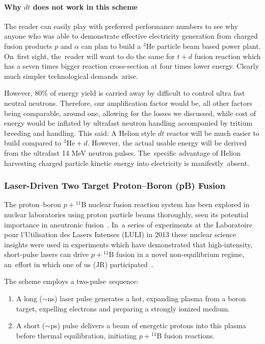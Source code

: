 \documentclass[particles,article,accept,pdftex,moreauthors]{Definitions/mdpi}
\begin{document}
\vspace{-6pt}\paragraph*{\bf Why $dt$ does not work in this scheme}
The reader can easily play with preferred performance numbers to see why anyone who was able to demonstrate effective electricity generation from charged fusion products $p$ and $\alpha$ can plan to build a ${}^3\mathrm{He}$ particle beam based power plant. On~first sight, the~reader will want to do the same for $t+d$ fusion reaction which has a seven times bigger reaction cross-section at four times lower energy. Clearly much simpler technological demands~arise.

However, 80\% of energy yield is carried away by difficult to control ultra fast neutral neutrons. Therefore, our amplification factor would be, all other factors being comparable, around one, allowing for the losses we discussed, while cost of energy would be inflated by ultrafast neutron handling accompanied by tritium breeding and handling. This said: A Helion style $dt$ reactor will be much easier to build compared to ${}^3\mathrm{He}+d$. However, the actual usable energy will be derived from the ultrafast 14 MeV neutron pulses. The~specific advantage of Helion harvesting charged particle kinetic energy into electricity is manifestly~absent.

\subsubsection{Laser-Driven Two Target Proton--Boron (pB) Fusion}\label{sssec:LULIpB}
The proton--boron $p+{}^{11}\mathrm{B}$ nuclear fusion reaction system has been explored in nuclear laboratories using proton particle beams thoroughly, seen its potential importance in aneutronic fusion~\cite{Stave:2011zz,Sikora:2016pB}. In~a series of experiments at the Laboratoire pour l'Utilisation des Lasers Intenses (LULI) in 2013 these nuclear science insights were used in experiments which have demonstrated that high-intensity, short-pulse lasers can drive $p+{}^{11}\mathrm{B}$ fusion in a novel non-equilibrium regime, an~effort in which one of us (JR) participated~\cite{Labaune:2013dla}.

The scheme employs a two-pulse~sequence:
\begin{enumerate}[nosep]
\item A long ($\sim$ns) laser pulse generates a hot, expanding plasma from a boron target, expelling electrons and preparing a strongly ionized medium.
\item A short ($\sim$ps) pulse delivers a beam of energetic protons into this plasma before thermal equilibration, initiating $p+{}^{11}\mathrm{B}$ fusion reactions.
\end{enumerate}
\end{document}
